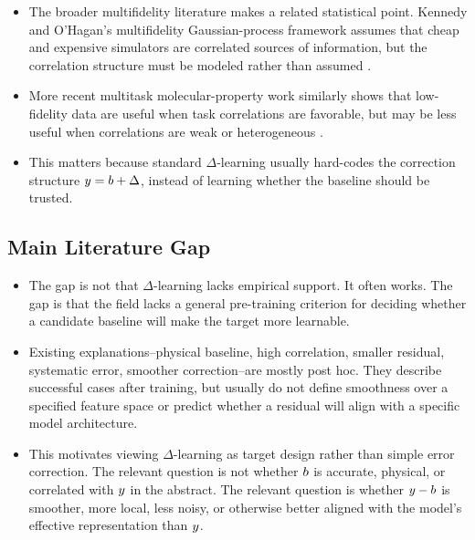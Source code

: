 \documentclass[11pt]{article}
\begin{document}
\begin{itemize}
  \item The broader multifidelity literature makes a related statistical point. Kennedy and O'Hagan's multifidelity Gaussian-process framework assumes that cheap and expensive simulators are correlated sources of information, but the correlation structure must be modeled rather than assumed \cite{kennedy2000multifidelity}.

  \item More recent multitask molecular-property work similarly shows that low-fidelity data are useful when task correlations are favorable, but may be less useful when correlations are weak or heterogeneous \cite{fisher2024multitask}.

  \item This matters because standard \(\Delta\)-learning usually hard-codes the correction structure \(y = b + \Delta\), instead of learning whether the baseline should be trusted.
\end{itemize}

\subsection*{Main Literature Gap}

\begin{itemize}
  \item The gap is not that \(\Delta\)-learning lacks empirical support. It often works. The gap is that the field lacks a general pre-training criterion for deciding whether a candidate baseline will make the target more learnable.

  \item Existing explanations--physical baseline, high correlation, smaller residual, systematic error, smoother correction--are mostly post hoc. They describe successful cases after training, but usually do not define smoothness over a specified feature space or predict whether a residual will align with a specific model architecture.

  \item This motivates viewing \(\Delta\)-learning as target design rather than simple error correction. The relevant question is not whether \(b\) is accurate, physical, or correlated with \(y\) in the abstract. The relevant question is whether \(y - b\) is smoother, more local, less noisy, or otherwise better aligned with the model's effective representation than \(y\).
\end{itemize}
\end{document}
